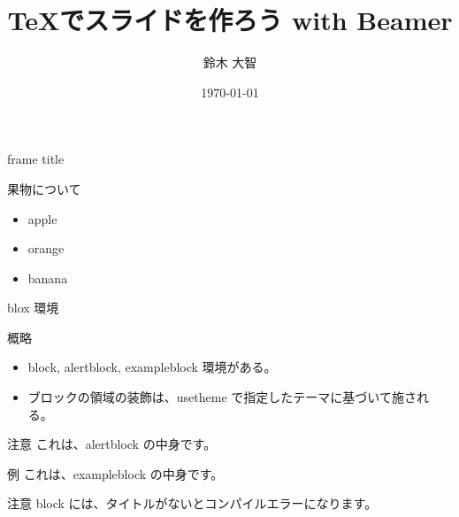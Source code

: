 \documentclass[dvipdfmx]{beamer}  %
\title[Beamer Tutorial]{\TeX でスライドを作ろう with Beamer}
\author[sudachi]{鈴木 大智}
\date{\today}
\institute[日本大学大学院]{日本大学大学院 理工学研究科 数学専攻}
\begin{document}
\frame{\maketitle}



\begin{frame}{frame title}

  果物について
  
  \begin{itemize}
    \item apple
    \item orange
    \item banana
  \end{itemize}
\end{frame}

\begin{frame}{blox 環境}

  \begin{block}{概略}
    \begin{itemize}
      \item block, alertblock, exampleblock 環境がある。
      \item ブロックの領域の装飾は、usetheme で指定したテーマに基づいて施される。
    \end{itemize}
  \end{block}

  \begin{alertblock}{注意}
    これは、alertblock の中身です。
  \end{alertblock}

  \begin{exampleblock}{例}
    これは、exampleblock の中身です。
  \end{exampleblock}

  \begin{alertblock}{注意}
    block には、タイトルがないとコンパイルエラーになります。
  \end{alertblock}

\end{frame}
\end{document}
